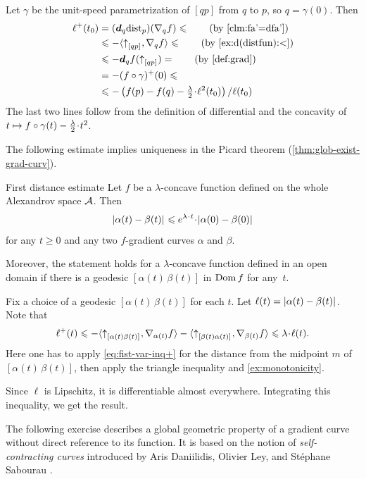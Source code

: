 Let $\gamma$ be the unit-speed parametrization of $[qp]$ from $q$ to $p$, so $q=\gamma(0)$.
Then 
\begin{align*}
\ell^+(t_0)&=(\dd_q\distfun_p)(\nabla_qf)\le\tag{by \ref{clm:fa'=dfa'}}
\\
&\le -\langle\dir qp,\nabla_qf\rangle \le \tag{by \ref{ex:d(distfun):<}}
\\
&\le -\dd_qf(\dir qp)=\tag{by \ref{def:grad}}
\\
&=-(f\circ\gamma)^+(0)\le 
\\
&\le -\left({f(p)}-{f(q)}-\tfrac\lambda2\cdot\ell^2(t_0)\right)/\ell(t_0)
\end{align*}
The last two lines follow from
the definition of differential
and the concavity of $t\z\mapsto f\circ\gamma(t)-\tfrac \lambda2\cdot {t^2}$.
\qeds

The following estimate implies uniqueness in the Picard theorem (\ref{thm:glob-exist-grad-curv}).

\begin{thm}{First distance estimate}\label{thm:dist-est}
Let $f$ be a $\lambda$-concave function defined on the whole Alexandrov space $\mathcal{A}$.
Then
\[\dist{\alpha(t)}{\beta(t)}{}
\le 
e^{\lambda\cdot t}\cdot\dist[{{}}]{\alpha(0)}{\beta(0)}{}\]
for any $t\ge 0$ and any two $f$-gradient curves $\alpha$ and $\beta$.

Moreover, the statement holds for a $\lambda$-concave function defined in an open domain if there is a geodesic $[\alpha(t)\,\beta(t)]$ in $\mathop{\rm Dom}\nolimits f$ for any~$t$.
\end{thm}

Fix a choice of a geodesic $[\alpha(t)\,\beta(t)]$ for each $t$.
Let $\ell(t)\z=\dist{\alpha(t)}{\beta(t)}{}$.
Note that
\[\ell^+(t)
\le-
\<\dir{\alpha(t)}{\beta(t)},\nabla_{\alpha(t)}f\>-\<\dir{\beta(t)}{\alpha(t)},\nabla_{\beta(t)}f\>
\le
\lambda\cdot\ell(t).\]
Here one has to apply \ref{eq:fist-var-inq+} for the distance from the midpoint $m$ of $[\alpha(t)\,\beta(t)]$, then apply the triangle inequality and \ref{ex:monotonicity}.

Since $\ell$ is Lipschitz, it is differentiable almost everywhere.
Integrating this inequality, we get the result.
\qeds



The following exercise describes a global geometric property of a gradient curve without direct reference to its function.
It is based on the notion of \emph{self-contracting curves} introduced by Aris Daniilidis, Olivier Ley, and Stéphane Sabourau \cite{daniilidis-ley-sabourau}.

